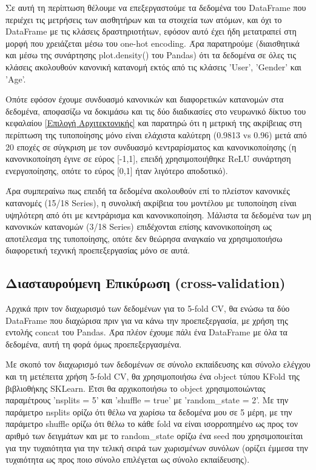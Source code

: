 \documentclass[12pt,a4paper]{article}
\begin{document}
Σε αυτή τη περίπτωση θέλουμε να επεξεργαστούμε τα δεδομένα του DataFrame που περιέχει τις μετρήσεις των αισθητήρων και τα στοιχεία των ατόμων, και όχι το DataFrame με τις κλάσεις δραστηριοτήτων, εφόσον αυτό έχει ήδη μετατραπεί στη μορφή που χρειάζεται μέσω του one-hot encoding. Άρα παρατηρούμε (διαισθητικά και μέσω της συνάρτησης plot.density() του Pandas) ότι τα δεδομένα σε όλες τις κλάσεις ακολουθούν κανονική κατανομή εκτός από τις κλάσεις 'User', 'Gender' και 'Age'.

Οπότε εφόσον έχουμε συνδυασμό κανονικών και διαφορετικών κατανομών στα δεδομένα, αποφασίζω να δοκιμάσω και τις δύο διαδικασίες στο νευρωνικό δίκτυο του κεφαλαίου \ref{Επιλογή Αρχιτεκτονικής} και παρατηρώ ότι η μετρική της ακρίβειας στη περίπτωση της τυποποίησης μόνο είναι ελάχιστα καλύτερη (0.9813 vs 0.96) μετά από 20 εποχές σε σύγκριση με τον συνδυασμό κεντραρίσματος και κανονικοποίησης (η κανονικοποίηση έγινε σε εύρος [-1,1], επειδή χρησιμοποιήθηκε ReLU συνάρτηση ενεργοποίησης, οπότε το εύρος [0,1] ήταν λιγότερο αποδοτικό).

Άρα συμπεραίνω πως επειδή τα δεδομένα ακολουθούν επί το πλείστον κανονικές κατανομές (15/18 Series), η συνολική ακρίβεια του μοντέλου με τυποποίηση είναι υψηλότερη από ότι με κεντράρισμα και κανονικοποίηση. Μάλιστα τα δεδομένα των μη κανονικών κατανομών (3/18 Series) επιδέχονται επίσης κανονικοποίηση ως αποτέλεσμα της τυποποίησης, οπότε δεν θεώρησα αναγκαίο να χρησιμοποιήσω διαφορετική τεχνική προεπεξεργασίας μόνο σε αυτά. 

\subsection{Διασταυρούμενη Επικύρωση (cross-validation)}

Αρχικά πριν τον διαχωρισμό των δεδομένων για το 5-fold CV, θα ενώσω τα δύο DataFrame που διαχώρισα πριν για να κάνω την προεπεξεργασία, με χρήση της εντολής concat του Pandas. Άρα πλέον έχουμε πάλι ένα DataFrame με όλα τα δεδομένα, αυτή τη φορά όμως προεπεξεργασμένα.

Με σκοπό τον διαχωρισμό των δεδομένων σε σύνολο εκπαίδευσης και σύνολο ελέγχου και τη μετέπειτα χρήση 5-fold CV, θα χρησιμοποιήσω ένα object τύπου KFold της βιβλιοθήκης SKLearn. Έτσι θα αρχικοποιήσω το object χρησιμοποιώντας παραμέτρους 'nsplits = 5' και 'shuffle = true' με 'random\_state = 2'. Με την παράμετρο nsplits ορίζω ότι θέλω να χωρίσω τα δεδομένα μου σε 5 μέρη, με την παράμετρο shuffle ορίζω ότι θέλω το κάθε fold να είναι ισορροπημένο ως προς τον αριθμό των δειγμάτων και με το random\_state ορίζω ένα seed που χρησιμοποιείται για την τυχαιότητα για την τελική σειρά των χωρισμένων συνόλων (ορίζει έμμεσα την τυχαιότητα ως προς ποιο σύνολο επιλέγεται ως σύνολο εκπαίδευσης).
\end{document}

